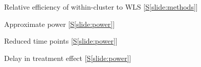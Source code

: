 \documentclass[9pt]{beamer}
\begin{document}
\begin{frame}{Relative efficiency of within-cluster to WLS [\hyperlink{slide:methods}{S\ref{slide:methods}}]} \label{apx:efficiency}
\end{frame}



\begin{frame}{Approximate power [\hyperlink{slide:power}{S\ref{slide:power}}]} \label{apx:power}
\end{frame}



\begin{frame}{Reduced time points [\hyperlink{slide:power}{S\ref{slide:power}}]} \label{apx:timepoints}
\end{frame}



\begin{frame}{Delay in treatment effect [\hyperlink{slide:power}{S\ref{slide:power}}]} \label{apx:delay}
\end{frame}
\end{document}
